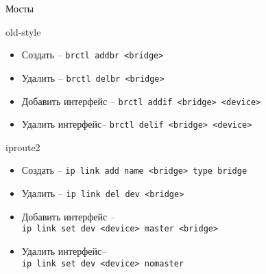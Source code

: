 \begin{frame}{Мосты}

    \begin{block}{old-style}
        \begin{itemize}
            \item Создать -- {\tt brctl addbr <bridge>}
            \item Удалить -- {\tt brctl delbr <bridge>}
            \item Добавить интерфейс -- {\tt brctl addif <bridge> <device>}
            \item Удалить интерфейс-- {\tt brctl delif <bridge> <device>}
        \end{itemize}
    \end{block}

    \begin{block}{iproute2}
        \begin{itemize}
            \item Создать -- {\tt ip link add name <bridge> type bridge}
            \item Удалить -- {\tt ip link del dev <bridge> }
            \item Добавить интерфейс -- \\ {\tt ip link set dev <device> master <bridge>}
            \item Удалить интерфейс-- \\ {\tt ip link set dev <device> nomaster}
        \end{itemize}
    \end{block}
\end{frame}


